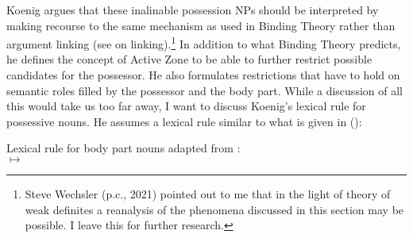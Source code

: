 \documentclass[output=paper,biblatex,babelshorthands,newtxmath,draftmode,colorlinks,citecolor=brown]{langscibook}
\begin{document}
Koenig argues that these inalinable possession NPs should be interpreted by making recourse to the
same mechanism as used in Binding Theory rather than argument linking (see
 on linking).\footnote{\label{fn-non-configurational-BT-SW}%
Steve Wechsler (p.c., 2021) pointed out to me that in the light of  theory
of weak definites a reanalysis of the phenomena discussed in this section may be possible. I leave this for further research.
} In addition to what Binding
Theory predicts, he defines the concept of Active Zone to be able to further restrict possible
candidates for the possessor. He also formulates restrictions that have to hold on semantic roles
filled by the possessor and the body part. While a discussion of all this would take us too far
away, I want to discuss Koenig's lexical rule for possessive nouns. He assumes a lexical rule
similar to what is given in ():

\ea
Lexical rule for body part nouns adapted from \citet[256]{Koenig1999b}:\\
 $\mapsto$\\
\flushright
{}

\medskip
\z
\end{document}
